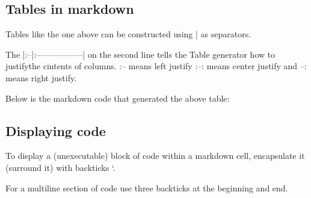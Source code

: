 \documentclass[letterpaper,10pt,english]{jupyterBook}
\begin{document}
\subsection{Tables in markdown}
\label{\detokenize{content/04_PythonEssentials/Intro_Jupyter_notebook:tables-in-markdown}}
\sphinxAtStartPar
Tables like the one above can be constructed using | as separators.

\sphinxAtStartPar
The |:–|:—————–| on the second line tells the Table generator how to justifythe cintents of columns.  :– means left justify :–: means center justify and –: means right justify.

\sphinxAtStartPar
Below is the markdown code that generated the above table:

\begin{sphinxVerbatim}[commandchars=\\\{\}]
                       
                                
 \PYGZbs{}
 \PYGZbs{}
 \PYGZbs{}\PYGZbs{} \PYGZbs{}\PYGZbs{}      
 \PYGZbs{} \PYGZbs{}      
 \PYGZbs{}         

\end{sphinxVerbatim}


\subsection{Displaying code}
\label{\detokenize{content/04_PythonEssentials/Intro_Jupyter_notebook:displaying-code}}
\sphinxAtStartPar
To display a (unexecutable)  block of code within a markdown cell, encapsulate it (surround it) with backticks `.

\sphinxAtStartPar
For a multiline section of code use three backticks at the beginning and end.
\end{document}
